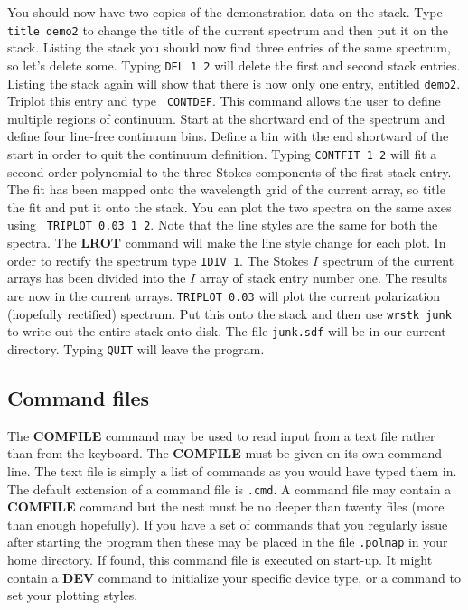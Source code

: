 You should now have two copies of the demonstration data on the
stack. Type {\tt title demo2} to change the title of the current
spectrum and then put it on the stack. Listing the stack you should
now find three entries of the same spectrum, so let's delete
some. Typing {\tt DEL 1 2} will delete the first and second stack
entries. Listing the stack again will show that there is now only one
entry, entitled {\tt demo2}. Triplot this entry and type {\tt
CONTDEF}.  This command allows the user to define multiple regions of
continuum. Start at the shortward end of the spectrum and define four
line-free continuum bins.  Define a bin with the end shortward of the
start in order to quit the continuum definition. Typing {\tt CONTFIT 1
2} will fit a second order polynomial to the three Stokes components
of the first stack entry. The fit has been mapped onto the wavelength
grid of the current array, so title the fit and put it onto the
stack. You can plot the two spectra on the same axes using {\tt
TRIPLOT 0.03 1 2}. Note that the line styles are the same for both the
spectra. The {\bf LROT} command will make the line style change for
each plot. In order to rectify the spectrum type {\tt IDIV 1}. The
Stokes $I$ spectrum of the current arrays has been divided into the
$I$ array of stack entry number one. The results are now in the
current arrays. {\tt TRIPLOT 0.03} will plot the current polarization
(hopefully rectified) spectrum. Put this onto the stack and then use
{\tt wrstk junk} to write out the entire stack onto disk. The file
{\tt junk.sdf} will be in our current directory. Typing {\tt QUIT}
will leave the program.

\subsection{Command files}

The {\bf COMFILE} command may be used to read input from a text file
rather than from the keyboard. The {\bf COMFILE} must be given on its
own command line. The text file is simply a list of commands as you
would have typed them in. The default extension of a command file is
{\tt .cmd}. A command file may contain a {\bf COMFILE} command but the
nest must be no deeper than twenty files (more than enough hopefully).
If you have a set of commands that you regularly issue after starting
the program then these may be placed in the file {\tt .polmap} in your
home directory. If found, this command file is executed on start-up.
It might contain a {\bf DEV} command to initialize your specific
device type, or a command to set your plotting styles.

